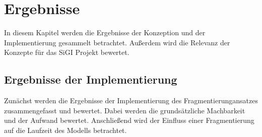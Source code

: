 \chapter{Ergebnisse}\label{ch:Ergebnisse}
    In diesem Kapitel werden die Ergebnisse der Konzeption und der Implementierung gesammelt betrachtet. Außerdem wird die Relevanz der Konzepte für das SiGI Projekt bewertet. 

\section{Ergebnisse der Implementierung}
    Zunächst werden die Ergebnisse der Implementierung des Fragmentierungansatzes zusammengefasst und bewertet. Dabei werden die grundsätzliche Machbarkeit und der Aufwand bewertet. Anschließend wird der Einfluss einer Fragmentierung auf die Laufzeit des Modells betrachtet.  

